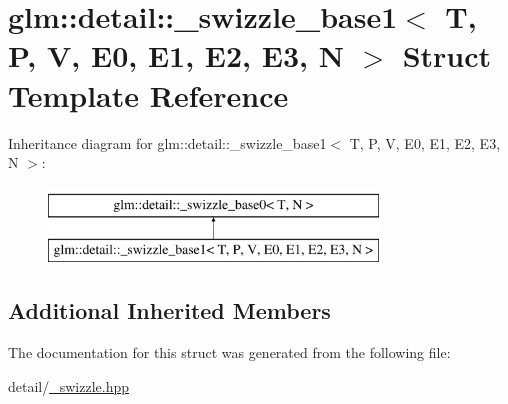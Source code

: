 \hypertarget{structglm_1_1detail_1_1__swizzle__base1}{\section{glm\-:\-:detail\-:\-:\-\_\-swizzle\-\_\-base1$<$ T, P, V, E0, E1, E2, E3, N $>$ Struct Template Reference}
\label{structglm_1_1detail_1_1__swizzle__base1}
}
Inheritance diagram for glm\-:\-:detail\-:\-:\-\_\-swizzle\-\_\-base1$<$ T, P, V, E0, E1, E2, E3, N $>$\-:\begin{figure}[H]
\begin{center}
\leavevmode
\includegraphics[height=2.000000cm]{structglm_1_1detail_1_1__swizzle__base1}
\end{center}
\end{figure}
\subsection*{Additional Inherited Members}


The documentation for this struct was generated from the following file\-:\begin{DoxyCompactItemize}
\item 
detail/\hyperlink{__swizzle_8hpp}{\-\_\-swizzle.\-hpp}\end{DoxyCompactItemize}
